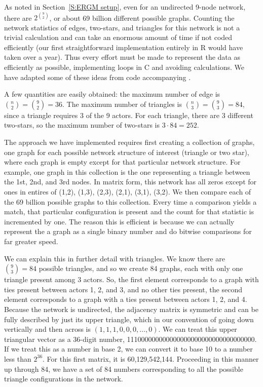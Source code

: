 \label{A:Triangle count}
As noted in Section~\ref{S:ERGM setup}, even for an undirected 9-node network, 
there are $2^{{9\choose 2}}$, or about 69 billion different possible graphs.
Counting the network statistics of edges, two-stars, and triangles for this
network is not a trivial calculation and can take an enormous amount of time 
if not coded efficiently (our first straightforward implementation 
entirely in R would have taken over a year).  Thus every effort must 
be made to represent the data as efficiently as possible, 
implementing loops in C and avoiding calculations.  We have adapted some of
these ideas from code accompanying \citet{Rinaldo:2009}.

A few quantities are easily obtained: the maximum number of edge is 
${n \choose 2} = {9 \choose 2} = 36$.  The maximum number of triangles is 
${n \choose 3} = {9 \choose 3} = 84$, since a triangle requires 3 of the 9 actors.  
For each triangle, there are 3  different two-stars, so the maximum number 
of two-stars is $3 \cdot 84 = 252$.


The approach we have implemented requires first creating a collection of graphs,
one graph for each possible network structure of interest (triangle or two star),
where each graph is empty except for that particular network structure.  For example,
one graph in this collection is the one representing a triangle between the 1st, 2nd, and 3rd nodes.  In matrix
form, this network has all zeros except for ones in entires of (1,2), (1,3), (2,3), 
(2,1), (3,1), (3,2).
We then compare each of the 69 billion possible graphs to this collection.
Every time a comparison yields a match, that particular configuration is present
and the count for that statistic is incremented by one.  
The reason this is efficient is because we can actually represent the 
a graph as a single binary number and do bitwise comparisons for far greater speed.

We can explain this in further detail with triangles.
We know there are ${9 \choose 3} = 84$ possible triangles, and so we create
84 graphs, each with only one triangle present among 3 actors.  
So, the first element corresponds to a graph with ties present between 
actors 1, 2, and 3, and no other ties present, the second element corresponds 
to a graph with a ties present between actors 1, 2, and 4.  
Because the network is undirected, the adjacency matrix is symmetric and 
can be fully described by just its upper triangle, which in our convention 
of going down vertically and then across is $(1,1,1,0,0,0, \ldots,0)$.  
We can treat this upper triangular vector as a 36-digit number, 
111000000000000000000000000000000000.  If we treat this as a number 
in base 2, we can convert it to base 10 to a number less than $2^{36}$.  
For this first matrix, it is 60,129,542,144.  Proceeding in this manner up 
through 84, we have a set of 84 numbers corresponding to all the possible 
triangle configurations in the network.  

